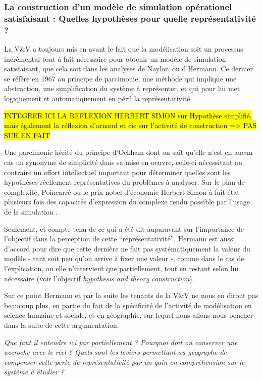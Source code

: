 \subsubsection{La construction d'un modèle de simulation opérationel satisfaisant : Quelles hypothèses pour quelle représentativité ?}
\label{sssec:hypothese_representativite}

La V\&V a toujours mis en avant le fait que la modélisation soit un processus incrémental tout à fait nécessaire pour obtenir un modèle de simulation satisfaisant, que cela soit dans les analyses de Naylor, ou d'Hermann. Ce dernier se réfère en 1967 au principe de parcimonie, une méthode qui implique une abstraction, une simplification du système à représenter, et qui pour lui met logiquement et automatiquement en péril la représentativité.  

\hl{INTEGRER ICI LA REFLEXION HERBERT SIMON sur Hypothèse simplifié, mais également la réflexion d'arnaud et cie sur l'activité de construction => PAS SUR EN FAIT}

Une parcimonie hérité du principe d'Ockham dont on sait qu'elle n'est en aucun cas un synonyme de simplicité dans sa mise en oeuvre, celle-ci nécessitant au contraire un effort intellectuel important pour déterminer quelles sont les hypothèses réellement représentatives du problèmes à analyser. Sur le plan de complexité, Poincarré ou le prix nobel d'économie Herbert Simon à fait état plusieurs fois des capacités d'expression du complexe rendu possible par l'usage de la simulation .\autocite{Banos2013a}

Seulement, et compte tenu de ce qui a été dit auparavant sur l'importance de l'objectif dans la perception de cette \enquote{représentativité}, Hermann est aussi d'accord pour dire que cette dernière ne fait pas systématiquement la valeur du modèle - tant soit peu qu'on arrive à fixer une valeur -, comme dans le cas de l'explication, ou elle n'intervient que partiellement, tout en restant selon lui nécessaire (voir l'objectif \textit{hypothesis and theory construction}).

Sur ce point Hermann et par la suite les tenants de la V\&V ne nous en diront pas beaucoup plus, en partie du fait de la spécificité de l'activité de modélisation en science humaine et sociale, et en géographie, sur lequel nous allons nous pencher dans la suite de cette argumentation.

\textit{Que faut il entendre ici par partiellement ? Pourquoi doit on conserver une accroche avec le réel ? Quels sont les leviers permettant au géographe de compenser cette perte de représentativité par un gain en compréhension sur le système à étudier ? }

